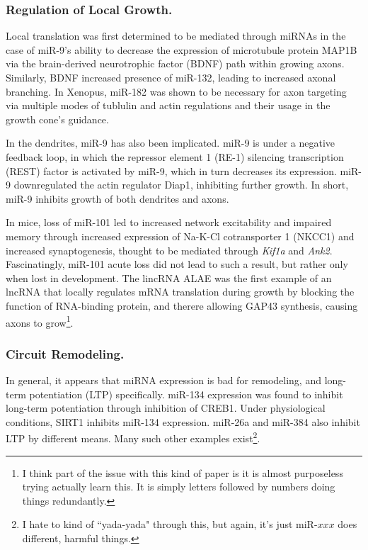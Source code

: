 \documentclass[12pt]{report}
\begin{document}
\subsubsection{Regulation of Local Growth.}

Local translation was first determined to be mediated through miRNAs in the case of miR-9's ability to decrease the expression of microtubule protein MAP1B via the brain-derived neurotrophic factor (BDNF) path within growing axons. Similarly, BDNF increased presence of miR-132, leading to increased axonal branching. In Xenopus, miR-182 was shown to be necessary for axon targeting via multiple modes of tublulin and actin regulations and their usage in the growth cone's guidance.\newline

In the dendrites, miR-9 has also been implicated. miR-9 is under a negative feedback loop, in which the repressor element 1 (RE-1) silencing transcription (REST) factor is activated by miR-9, which in turn decreases its expression. miR-9 downregulated the actin regulator Diap1, inhibiting further growth. In short, miR-9 inhibits growth of both dendrites and axons.\newline

In mice, loss of miR-101 led to increased network excitability and impaired memory through increased expression of Na-K-Cl cotransporter 1 (NKCC1) and increased synaptogenesis, thought to be mediated through \textit{Kif1a} and \textit{Ank2}. Fascinatingly, miR-101 acute loss did not lead to such a result, but rather only when lost in development. The lincRNA ALAE was the first example of an lncRNA that locally regulates mRNA translation during growth by blocking the function of RNA-binding protein, and therere allowing GAP43 synthesis, causing axons to grow\footnote{I think part of the issue with this kind of paper is it is almost purposeless trying actually learn this. It is simply letters followed by numbers doing things redundantly.}.\newline

\subsubsection{Circuit Remodeling.}

In general, it appears that miRNA expression is bad for remodeling, and long-term potentiation (LTP) specifically. miR-134 expression was found to inhibit long-term potentiation through inhibition of CREB1. Under physiological conditions, SIRT1 inhibits miR-134 expression. miR-26a and miR-384 also inhibit LTP by different means. Many such other examples exist\footnote{I hate to kind of ``yada-yada" through this, but again, it's just miR-$xxx$ does different, harmful things.}.\newline
\end{document}
